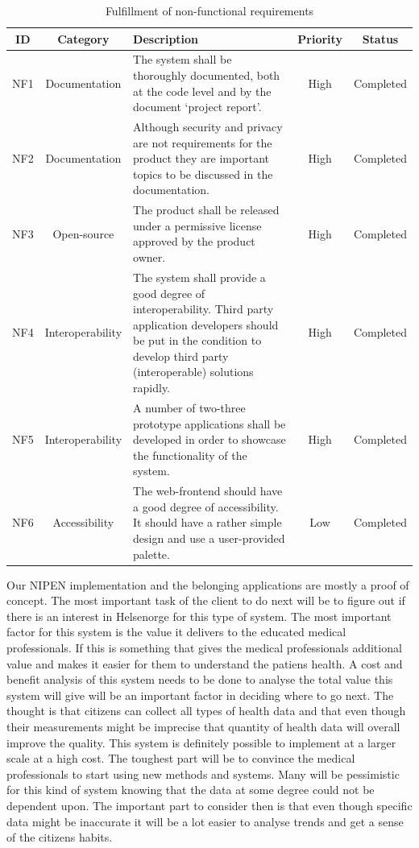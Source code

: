 \begin{table}[H]
\begin{center}
\begin{tabular}{ | c | c |p{6.5cm} | c | c |}
  \hline
  ID & Category & Description & Priority & Status\\
  \hline\noalign{\smallskip}\noalign{\smallskip}\hline
  NF1 & Documentation & The system shall be thoroughly documented, both at the code level and by the document ‘project report’.
  & High & Completed \\
  NF2 & Documentation & Although security and privacy are not requirements for the product they are important topics to be discussed in the documentation.
  & High & Completed \\
  NF3 & Open-source	& The product shall be released under a permissive license approved by the product owner.
  & High & Completed \\
  NF4 & Interoperability & The system shall provide a good degree of interoperability. Third party application developers should be put in the condition to develop third party (interoperable) solutions rapidly.
  & High & Completed \\
  NF5 & Interoperability & A number of two-three prototype applications shall be developed in order to showcase the functionality of the system.
  & High & Completed \\
  NF6 & Accessibility & The web-frontend should have a good degree of accessibility. It should have a rather simple design and use a user-provided palette.
  & Low & Completed \\
  \hline
\end{tabular}
\end{center}
\caption{Fulfillment of non-functional requirements}
\label{table:fullfilmentnonfunctionalreq}
\end{table} 



\iffalse
Our NIPEN implementation and the belonging applications are mostly a proof of concept. 
The most important task of the client to do next will be to figure out if there is an interest in Helsenorge for this type of system.
The most important factor for this system is the value it delivers to the educated medical professionals. 
If this is something that gives the medical professionals additional value and makes it easier for them to understand the patiens health. 
A cost and benefit analysis of this system needs to be done to analyse the total value this system will give will be an important factor in deciding where to go next.
The thought is that citizens can collect all types of health data and that even though their measurements might be imprecise that quantity of health data will overall improve the quality.
This system is definitely possible to implement at a larger scale at a high cost.
The toughest part will be to convince the medical professionals to start using new methods and systems. 
Many will be pessimistic for this kind of system knowing that the data at some degree could not be dependent upon.
The important part to consider then is that even though specific data might be inaccurate it will be a lot easier to analyse trends and get a sense of the citizens habits. 

